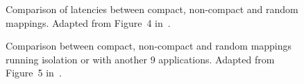 \begin{figure}[h]
	\centering
	\caption{Comparison of latencies between compact, non-compact and random mappings. Adapted from Figure~4 in~\cite{goens_samos19}.}
	\label{fig:compact_latency}
\end{figure}


\begin{figure}[h]
	\centering
	\caption{Comparison between compact, non-compact and random mappings running isolation or with another 9 applications. Adapted from Figure~5 in~\cite{goens_samos19}.}
	\label{fig:compact_cases}
\end{figure}